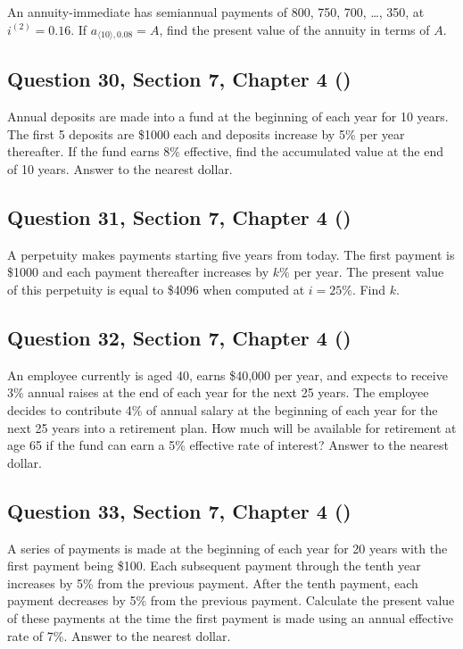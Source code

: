 \documentclass[12pt, a4paper]{article}
\newcommand{\angl}[1]{\langle #1 \rangle}
\begin{document}
\noindent An annuity-immediate has semiannual payments of 800, 750, 700, \dots, 350, at \( i^{(2)} = 0.16. \)  
If \( a_{\angl{10}, 0.08} = A \), find the present value of the annuity in terms of \( A. \)

\subsection*{Question 30, Section 7, Chapter 4  (\cite{toi3rd})}

\noindent Annual deposits are made into a fund at the beginning of each year for 10 years. The first 5 deposits are \$1000 each and deposits increase by 5\% per year thereafter.  If the fund earns 8\% effective, find the accumulated value at the end of 10 years. Answer to the nearest dollar.

\subsection*{Question 31, Section 7, Chapter 4  (\cite{toi3rd})}

\noindent A perpetuity makes payments starting five years from today. The first payment is \$1000 and each payment thereafter increases by \( k\% \) per year.  The present value of this perpetuity is equal to \$4096 when computed at \( i = 25\% \). Find \( k \).

\subsection*{Question 32, Section 7, Chapter 4  (\cite{toi3rd})}

\noindent An employee currently is aged 40, earns \$40{,}000 per year, and expects to receive 3\% annual raises at the end of each year for the next 25 years. The employee decides to contribute 4\% of annual salary at the beginning of each year for the next 25 years into a retirement plan. How much will be available for retirement at age 65 if the fund can earn a 5\% effective rate of interest? Answer to the nearest dollar.

\subsection*{Question 33, Section 7, Chapter 4  (\cite{toi3rd})}

\noindent A series of payments is made at the beginning of each year for 20 years with the first payment being \$100. Each subsequent payment through the tenth year increases by 5\% from the previous payment.  After the tenth payment, each payment decreases by 5\% from the previous payment. Calculate the present value of these payments at the time the first payment is made using an annual effective rate of 7\%.  Answer to the nearest dollar.
\end{document}
